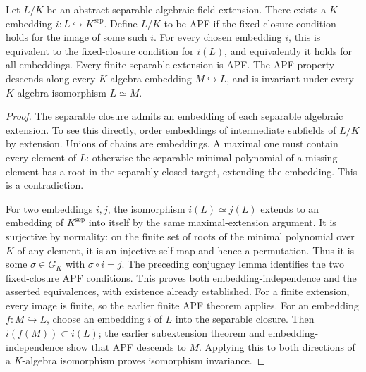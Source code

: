 \begin{proposition}
\label{fw:apf-abstract}
\leanok
Let $L/K$ be an abstract separable algebraic field extension. There exists
a $K$-embedding $i:L\hookrightarrow K^{\mathrm{sep}}$. Define $L/K$ to be
APF if the fixed-closure condition holds for the image of some such $i$.
For every chosen embedding $i$, this is equivalent to the fixed-closure
condition for $i(L)$, and equivalently it holds for all embeddings.
Every finite separable extension is APF. The APF property descends along
every $K$-algebra embedding $M\hookrightarrow L$, and is invariant under
every $K$-algebra isomorphism $L\simeq M$.
\end{proposition}
\begin{proof}
The separable closure admits an embedding of each separable algebraic
extension. To see this directly, order embeddings of intermediate
subfields of $L/K$ by extension. Unions of chains are embeddings. A
maximal one must contain every element of $L$: otherwise the separable
minimal polynomial of a missing element has a root in the separably
closed target, extending the embedding. This is a contradiction.

For two embeddings $i,j$, the isomorphism $i(L)\simeq j(L)$ extends to
an embedding of $K^{\mathrm{sep}}$ into itself by the same maximal-extension
argument. It is surjective by normality: on the finite set of roots of
the minimal polynomial over $K$ of any element, it is an injective
self-map and hence a permutation. Thus it is some $\sigma\in G_K$ with
$\sigma\circ i=j$. The preceding conjugacy lemma identifies the two
fixed-closure APF conditions. This proves both embedding-independence
and the asserted equivalences, with existence already established.
For a finite extension, every image is finite, so the earlier finite
APF theorem applies. For an embedding $f:M\hookrightarrow L$, choose an
embedding $i$ of $L$ into the separable closure. Then $i(f(M))\subset i(L)$;
the earlier subextension theorem and embedding-independence show that
APF descends to $M$. Applying this to both directions of a $K$-algebra
isomorphism proves isomorphism invariance.
\end{proof}

